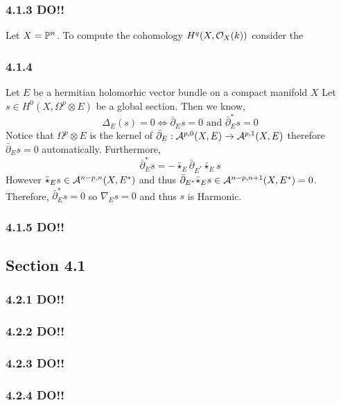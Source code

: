 \documentclass[12pt]{article}
\begin{document}
\subsubsection{4.1.3 DO!!}

Let $X = \P^n$.
To compute the cohomology $H^q(X, \struct{X}(k))$ consider the  

\subsubsection{4.1.4}

Let $E$ be a hermitian holomorhic vector bundle on a compact \kahler manifold $X$ Let $s \in H^0(X, \Omega^p \otimes E)$ be a global section. Then we know,
\[ \Delta_E(s) = 0 \iff \bar{\partial}_E s = 0 \text{ and } \bar{\partial}_E^* s = 0 \]
Notice that $\Omega^p \otimes E$ is the kernel of $\bar{\partial}_E : \A^{p,0}(X, E) \to \A^{p, 1}(X, E)$ therefore $\bar{\partial}_E s = 0$ automatically. Furthermore, 
\[ \bar{\partial}^*_E s = - \bar{\star}_E \bar{\partial}_{E^*} \bar{\star}_E s \]
However $\bar{\star}_E s \in \A^{n-p,n}(X, E^*)$ and thus $\bar{\partial}_{E^*} \bar{\star}_E s \in \A^{n-p,n+1}(X, E^*) = 0$. Therefore, $\bar{\partial}^*_E s = 0$ so $\nabla_E s = 0$ and thus $s$ is Harmonic.

\subsubsection{4.1.5 DO!!}

\subsection{Section 4.1}

\subsubsection{4.2.1 DO!!}

\subsubsection{4.2.2 DO!!}

\subsubsection{4.2.3 DO!!}

\subsubsection{4.2.4 DO!!}
\end{document}
